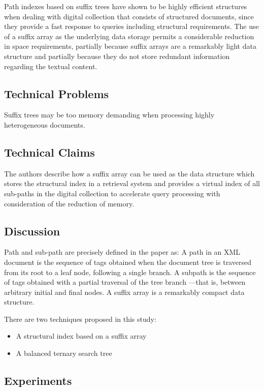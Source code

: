 \documentclass{paper}
\begin{document}
	Path indexes based on suffix trees have shown to be highly efficient
	structures when dealing with digital collection that consists of
	structured documents, since they provide a fast response to queries
	including structural requirements. The use of a suffix array as the
	underlying data storage permits a considerable reduction in space
	requirements, partially because suffix arrays are a remarkably light
	data structure and partially because they do not store redundant
	information regarding the textual content. 
	
	
	\subsection{Technical Problems}
	
	Suffix trees may be too memory demanding when processing highly
	heterogeneous documents.
	
	\subsection{Technical Claims}
	
	The authors describe how a suffix array can be used as the data
	structure which stores the structural index in a retrieval system and
	provides a virtual index of all sub-paths in the digital collection 
	to accelerate query processing with consideration of the reduction 
	of memory.
	
	\subsection{Discussion}
	
	Path and sub-path are precisely defined in the paper as:  A path in an
	XML document is the sequence of tags obtained when the document tree
	is traversed from its root to a leaf node, following a single branch.
	A subpath is the sequence of tags obtained with a partial traversal of
	the tree branch —that is, between arbitrary initial and final nodes. A
	suffix array is a remarkably compact data structure. 
	
	There are two techniques proposed in this study:
	\begin{itemize}
		\item A structural index based on a suffix array
		\item A balanced ternary search tree
	\end{itemize}
	
	
	\subsection{Experiments}
	
\end{document}
